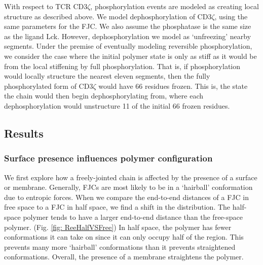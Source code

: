 \documentclass[../../AdvancementSummary.tex]{subfiles}
\begin{document}
With respect to TCR CD3$\zeta$, phosphorylation events are modeled as creating local structure as described above. We model dephosphorylation of CD3$\zeta$, using the same parameters for the FJC. We also assume the phosphatase is the same size as the ligand Lck. However, dephosphorylation we model as `unfreezing' nearby segments. Under the premise of eventually modeling reversible phosphorylation, we consider the case where the initial polymer state is only as stiff as it would be from the local stiffening by full phosphorylation.  That is, if phosphorylation would locally structure the nearest eleven segments, then the fully phosphorylated form of CD3$\zeta$ would have 66 residues frozen. This is, the state the chain would then begin dephosphorylating from, where each dephosphorylation would unstructure 11 of the initial 66 frozen residues. 


\subsection{Results}

\subsubsection{Surface presence influences polymer configuration}
We first explore how a freely-jointed chain is affected by the presence of a surface or membrane. Generally, FJCs are most likely to be in a `hairball' conformation due to entropic forces. When we compare the end-to-end distances of a FJC in free space to a FJC in half space, we find a shift in the distribution. The half-space polymer tends to have a larger end-to-end distance than the free-space polymer. (Fig. \ref{fig: ReeHalfVSFree}) In half space, the polymer has fewer conformations it can take on since it can only occupy half of the region. This prevents many more `hairball' conformations than it prevents straightened conformations.  Overall, the presence of a membrane straightens the polymer. 
\end{document}
